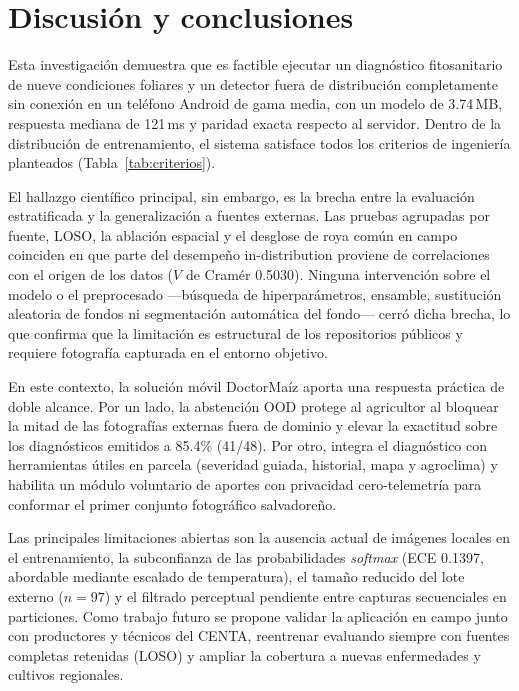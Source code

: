 \documentclass[conference,letterpaper]{IEEEtran}
\begin{document}
\section{Discusión y conclusiones}\label{sec:discusion}

Esta investigación demuestra que es factible ejecutar un diagnóstico fitosanitario de nueve condiciones foliares y un detector fuera de distribución completamente sin conexión en un teléfono Android de gama media, con un modelo de 3.74\,MB, respuesta mediana de 121\,ms y paridad exacta respecto al servidor. Dentro de la distribución de entrenamiento, el sistema satisface todos los criterios de ingeniería planteados (Tabla~\ref{tab:criterios}).

El hallazgo científico principal, sin embargo, es la brecha entre la evaluación estratificada y la generalización a fuentes externas. Las pruebas agrupadas por fuente, LOSO, la ablación espacial y el desglose de roya común en campo coinciden en que parte del desempeño in-distribution proviene de correlaciones con el origen de los datos ($V$ de Cramér 0.5030). Ninguna intervención sobre el modelo o el preprocesado —búsqueda de hiperparámetros, ensamble, sustitución aleatoria de fondos ni segmentación automática del fondo— cerró dicha brecha, lo que confirma que la limitación es estructural de los repositorios públicos y requiere fotografía capturada en el entorno objetivo.

En este contexto, la solución móvil DoctorMaíz aporta una respuesta práctica de doble alcance. Por un lado, la abstención OOD protege al agricultor al bloquear la mitad de las fotografías externas fuera de dominio y elevar la exactitud sobre los diagnósticos emitidos a 85.4\% (41/48). Por otro, integra el diagnóstico con herramientas útiles en parcela (severidad guiada, historial, mapa y agroclima) y habilita un módulo voluntario de aportes con privacidad cero-telemetría para conformar el primer conjunto fotográfico salvadoreño.

Las principales limitaciones abiertas son la ausencia actual de imágenes locales en el entrenamiento, la subconfianza de las probabilidades \textit{softmax} (ECE 0.1397, abordable mediante escalado de temperatura), el tamaño reducido del lote externo ($n=97$) y el filtrado perceptual pendiente entre capturas secuenciales en particiones. Como trabajo futuro se propone validar la aplicación en campo junto con productores y técnicos del CENTA, reentrenar evaluando siempre con fuentes completas retenidas (LOSO) y ampliar la cobertura a nuevas enfermedades y cultivos regionales.
\end{document}
